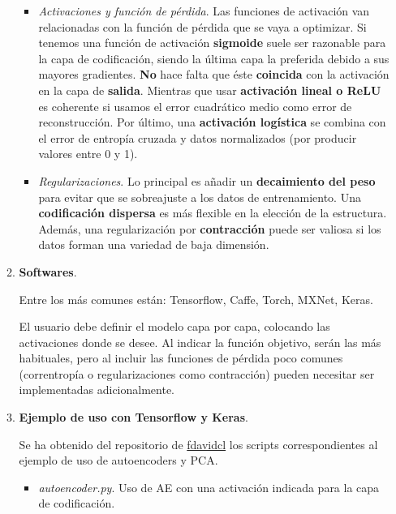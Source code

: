 \begin{enumerate}
\begin{enumerate}
\begin{itemize}
            \item \textit{Activaciones y función de pérdida}. Las funciones de activación van relacionadas con la función de pérdida que se vaya a optimizar. Si tenemos una función de activación \textbf{sigmoide} suele ser razonable para la capa de codificación, siendo la última capa la preferida debido a sus mayores gradientes. \textbf{No} hace falta que éste \textbf{coincida} con la activación en la capa de \textbf{salida}. Mientras que usar \textbf{activación lineal o ReLU} es coherente si usamos el error cuadrático medio como error de reconstrucción. Por último, una \textbf{activación logística} se combina con el error de entropía cruzada y datos normalizados (por producir valores entre 0 y 1).
            
            \item \textit{Regularizaciones}. Lo principal es añadir un \textbf{decaimiento del peso} para evitar que se sobreajuste a los datos de entrenamiento. Una \textbf{codificación dispersa} es más flexible en la elección de la estructura. Además, una regularización por \textbf{contracción} puede ser valiosa si los datos forman una variedad de baja dimensión.
            
        \end{itemize}
        
        \vspace{5mm}
        \item \textbf{Softwares}.
        \par
        Entre los más comunes están: Tensorflow, Caffe, Torch, MXNet, Keras.
        
        El usuario debe definir el modelo capa por capa, colocando las activaciones donde se desee. Al indicar la función objetivo, serán las más habituales, pero al incluir las funciones de pérdida poco comunes (correntropía o regularizaciones como contracción) pueden necesitar ser implementadas adicionalmente.
        
        \vspace{5mm}
        \item \textbf{Ejemplo de uso con Tensorflow y Keras}.
        
        \par
        Se ha obtenido del repositorio de \hyperlink{https://github.com/fdavidcl/ae-review-resources}{fdavidcl} los scripts correspondientes al ejemplo de uso de autoencoders y PCA. 
        
        \begin{itemize}
            \item \textit{autoencoder.py}. Uso de AE con una activación indicada para la capa de codificación. 
            

\end{itemize}
\end{enumerate}
\end{enumerate}
